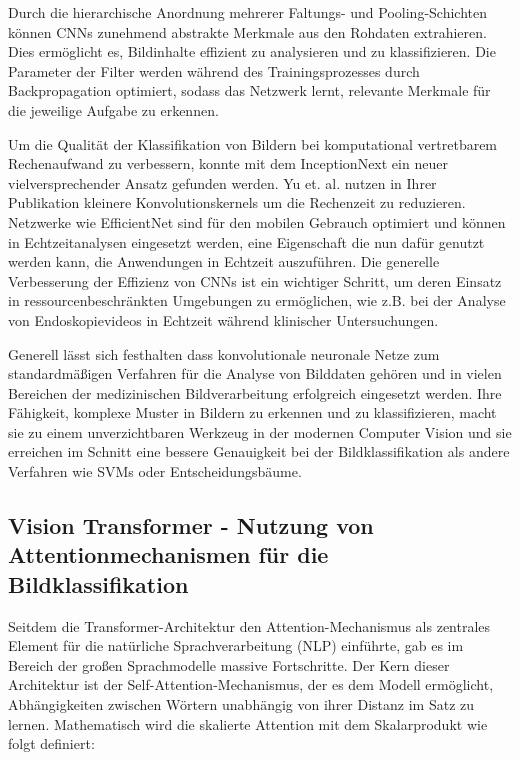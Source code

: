 Durch die hierarchische Anordnung mehrerer Faltungs- und Pooling-Schichten können CNNs zunehmend abstrakte Merkmale aus den Rohdaten extrahieren. Dies ermöglicht es, Bildinhalte effizient zu analysieren und zu klassifizieren. Die Parameter der Filter werden während des Trainingsprozesses durch Backpropagation optimiert, sodass das Netzwerk lernt, relevante Merkmale für die jeweilige Aufgabe zu erkennen. 

Um die Qualität der Klassifikation von Bildern bei komputational vertretbarem Rechenaufwand zu verbessern, konnte mit dem InceptionNext ein neuer vielversprechender Ansatz gefunden werden. \cite{yu2024inceptionnext}
Yu et. al. nutzen in Ihrer Publikation kleinere Konvolutionskernels um die Rechenzeit zu reduzieren. Netzwerke wie EfficientNet sind für den mobilen Gebrauch optimiert und können in Echtzeitanalysen eingesetzt werden, eine Eigenschaft die nun dafür genutzt werden kann, die Anwendungen in Echtzeit auszuführen. \cite{Tan2019EfficientNetRM} Die generelle Verbesserung der Effizienz von CNNs ist ein wichtiger Schritt, um deren Einsatz in ressourcenbeschränkten Umgebungen zu ermöglichen, wie z.B. bei der Analyse von Endoskopievideos in Echtzeit während klinischer Untersuchungen.

Generell lässt sich festhalten dass konvolutionale neuronale Netze zum standardmäßigen Verfahren für die Analyse von Bilddaten gehören und in vielen Bereichen der medizinischen Bildverarbeitung erfolgreich eingesetzt werden. Ihre Fähigkeit, komplexe Muster in Bildern zu erkennen und zu klassifizieren, macht sie zu einem unverzichtbaren Werkzeug in der modernen Computer Vision und sie erreichen im Schnitt eine bessere Genauigkeit bei der Bildklassifikation als andere Verfahren wie SVMs oder Entscheidungsbäume. \cite{Voulodimos2018DeepLF}

\subsection{Vision Transformer - Nutzung von Attentionmechanismen für die Bildklassifikation}

Seitdem die Transformer-Architektur \cite{NIPS2017_3f5ee243} den Attention-Mechanismus als zentrales Element für die natürliche Sprachverarbeitung (NLP) einführte, gab es im Bereich der großen Sprachmodelle massive Fortschritte. Der Kern dieser Architektur ist der Self-Attention-Mechanismus, der es dem Modell ermöglicht, Abhängigkeiten zwischen Wörtern unabhängig von ihrer Distanz im Satz zu lernen. Mathematisch wird die skalierte Attention mit dem Skalarprodukt wie folgt definiert:

